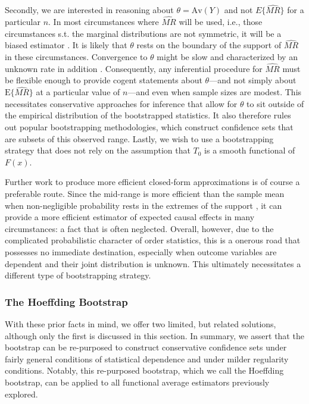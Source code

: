 \documentclass[12pt]{amsart}
\theoremstyle{plain}%
\theoremstyle{definition}
\theoremstyle{remark}
\numberwithin{equation}{section}
\begin{document}
Secondly, we are interested in reasoning about $\theta = \text{Av}(Y)$ and not $E\{ \hat{MR}\}$ for a particular $n$. In most circumstances where $\hat{MR}$ will be used, i.e., those circumstances s.t. the marginal distributions are not symmetric, it will be a biased estimator \cite{arce1988midrange}. It is likely that $\theta$ rests on the boundary of the support of $\hat{MR}$ in these circumstances. Convergence to $\theta$ might be slow and characterized by an unknown rate in addition \cite{broffitt1974example}. Consequently, any inferential procedure for $\hat{MR}$ must be flexible enough to provide cogent statements about $\theta$---and not simply about $\text{E} \{\hat{MR} \}$ at a particular value of $n$---and even when sample sizes are modest. This necessitates conservative approaches for inference that allow for $\theta$ to sit outside of the empirical distribution of the bootstrapped statistics. It also therefore rules out popular bootstrapping methodologies, which construct confidence sets that are subsets of this observed range. Lastly, we wish to use a bootstrapping strategy that does not rely on the assumption that $T_0$ is a smooth functional of $F(x)$.

Further work to produce more efficient closed-form approximations is of course a preferable route. Since the mid-range is more efficient than the sample mean when non-negligible probability rests in the extremes of the support \cite{rider1957midrange}, it can provide a more efficient estimator of expected causal effects in many circumstances: a fact that is often neglected. Overall, however, due to the complicated probabilistic character of order statistics, this is a onerous road that possesses no immediate destination, especially when outcome variables are dependent and their joint distribution is unknown. This ultimately necessitates a different type of bootstrapping strategy.
\subsubsection{The Hoeffding Bootstrap}
With these prior facts in mind, we offer two limited, but related solutions, although only the first is discussed in this section. In summary, we assert that the bootstrap can be re-purposed to construct conservative confidence sets under fairly general conditions of statistical dependence and under milder regularity conditions. Notably, this re-purposed bootstrap, which we call the Hoeffding bootstrap, can be applied to all functional average estimators previously explored.
\end{document}

